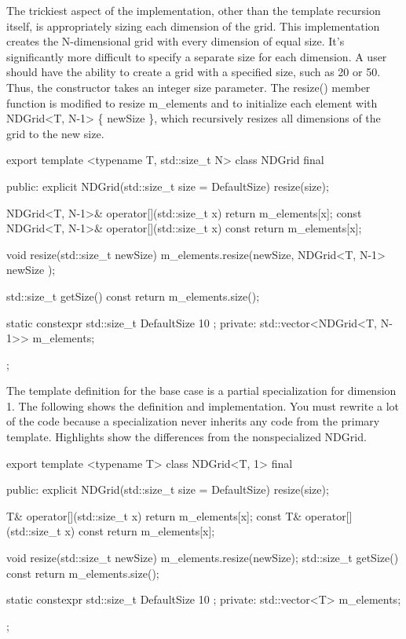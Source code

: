 The trickiest aspect of the implementation, other than the template recursion itself, is appropriately sizing each dimension of the grid. This implementation creates the N-dimensional grid with every dimension of equal size. It’s significantly more difficult to specify a separate size for each dimension. A user should have the ability to create a grid with a specified size, such as 20 or 50. Thus, the constructor takes an integer size parameter. The resize() member function is modified to resize m\_elements and to initialize each element with NDGrid<T, N-1> \{ newSize \}, which recursively resizes all dimensions of the grid to the new size.

\begin{cpp}
export template <typename T, std::size_t N>
class NDGrid final
{
    public:
        explicit NDGrid(std::size_t size = DefaultSize) { resize(size); }

        NDGrid<T, N-1>& operator[](std::size_t x) { return m_elements[x]; }
        const NDGrid<T, N-1>& operator[](std::size_t x) const {
            return m_elements[x]; }

        void resize(std::size_t newSize)
        {
            m_elements.resize(newSize, NDGrid<T, N-1> { newSize });
        }

        std::size_t getSize() const { return m_elements.size(); }

        static constexpr std::size_t DefaultSize { 10 };
    private:
        std::vector<NDGrid<T, N-1>> m_elements;
};
\end{cpp}

The template definition for the base case is a partial specialization for dimension 1. The following shows the definition and implementation. You must rewrite a lot of the code because a specialization never inherits any code from the primary template. Highlights show the differences from the nonspecialized NDGrid.

\begin{cpp}
export template <typename T>
class NDGrid<T, 1> final
{
    public:
        explicit NDGrid(std::size_t size = DefaultSize) { resize(size); }

        T& operator[](std::size_t x) { return m_elements[x]; }
        const T& operator[](std::size_t x) const { return m_elements[x]; }

        void resize(std::size_t newSize) { m_elements.resize(newSize); }
        std::size_t getSize() const { return m_elements.size(); }

        static constexpr std::size_t DefaultSize { 10 };
    private:
        std::vector<T> m_elements;
};
\end{cpp}

